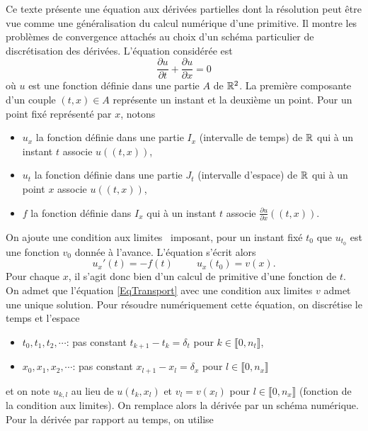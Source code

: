 Ce texte présente une équation aux dérivées partielles dont la résolution peut être vue comme une généralisation du calcul numérique d'une primitive. Il montre les problèmes de convergence attachés au choix d'un schéma particulier de discrétisation des dérivées. L'équation considérée est
\begin{equation}
 \frac{\partial u}{\partial t} + \frac{\partial u}{\partial x} = 0 \label{EqTransport}
\end{equation}
où $u$ est une fonction définie dans une partie $A$ de $\mathbb{R}^2$. La première composante d'un couple $(t,x)\in A$ représente un instant et la deuxième un point.\newline
Pour un point fixé représenté par $x$, notons 
\begin{itemize}
 \item $u_x$ la fonction définie dans une partie $I_x$ (intervalle de temps) de $\mathbb{R}$ qui à un instant $t$ associe $u((t,x))$,  
 \item $u_t$ la fonction définie dans une partie $J_t$ (intervalle d'espace) de $\mathbb{R}$ qui à un point $x$ associe $u((t,x))$,  
 \item $f$ la fonction définie dans $I_x$ qui à un instant $t$ associe $\frac{\partial u}{\partial x}((t,x))$.
\end{itemize}
On ajoute une \og condition aux limites\fg~ imposant, pour un instant fixé $t_0$ que $u_{t_0}$ est une fonction $v_0$ donnée à l'avance. L'équation s'écrit alors
\[
 u_x'(t) = -f(t) \hspace{1cm} u_x(t_0) = v(x).
\]
Pour chaque $x$, il s'agit donc bien d'un calcul de primitive d'une fonction de $t$. On admet que l'équation \ref{EqTransport} avec une condition aux limites $v$ admet une unique solution.\newline
Pour résoudre numériquement cette équation, on discrétise le temps et l'espace
\begin{itemize}
 \item $t_0, t_1, t_2, \cdots $: pas constant $t_{k+1} - t_k = \delta_t$ pour $k\in \llbracket 0, n_t \rrbracket$,
 \item $x_0, x_1, x_2, \cdots$:  pas constant $x_{l+1} - x_l = \delta_x$ pour $l\in \llbracket 0, n_x \rrbracket$
\end{itemize}
et on note $u_{k,l}$ au lieu de $u(t_k,x_l)$ et $v_l = v(x_l)$ pour $l\in \llbracket 0, n_x\rrbracket$ (fonction de la condition aux limites). On remplace alors la dérivée par un schéma numérique.\newline
Pour la dérivée par rapport au temps, on utilise
